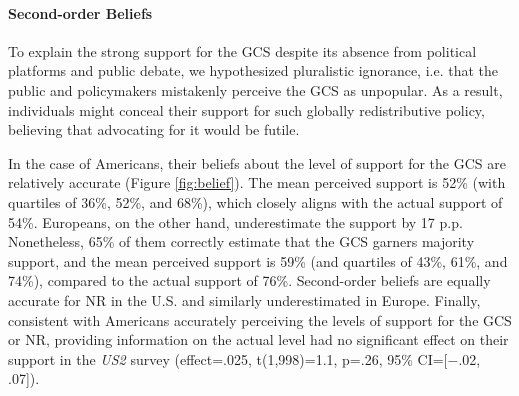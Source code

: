 \begin{bibunit}
\begin{tcolorbox}\label{subsec:second_order_beliefs}
  \paragraph{Second-order Beliefs}
To explain the strong support for the GCS despite its absence from political platforms and public debate, we hypothesized pluralistic ignorance, i.e. that the public and policymakers mistakenly perceive the GCS as unpopular. As a result, individuals might conceal their support for such globally redistributive policy, believing that advocating for it would be futile. 

In the case of Americans, their beliefs about the level of support for the GCS are relatively accurate (Figure \ref{fig:belief}). The mean perceived support is 52\% (with quartiles of 36\%, 52\%, and 68\%), which closely aligns with the actual support of 54\%. Europeans, on the other hand, underestimate the support by 17 p.p. Nonetheless, 65\% of them correctly estimate that the GCS garners majority support, and the mean perceived support is 59\% (and quartiles of 43\%, 61\%, and 74\%), compared to the actual support of 76\%. %
Second-order beliefs are equally accurate for NR in the U.S. and similarly underestimated in Europe. %
Finally, consistent with Americans accurately perceiving the levels of support for the GCS or NR, providing information on the actual level had no significant effect on their support in the \textit{US2} survey (effect=.025, t(1,998)=1.1, p=.26, 95\% CI=[$-$.02, .07]). %
\end{tcolorbox}



\end{bibunit}

